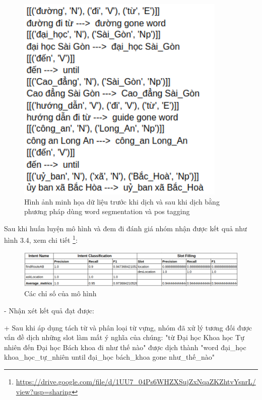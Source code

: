  \begin{figure}[htp]
              \centering
              \includegraphics[width=10cm]{images/trainingdata-wordsegment.png} 
              \caption{Hình ảnh minh họa dữ liệu trước khi dịch và sau khi dịch bằng phương pháp dùng word segmentation và pos tagging}
              \label{fig:sodohethongchiduong}

          \end{figure} 
	



Sau khi huấn luyện mô hình và đem đi đánh giá nhóm nhận được kết quả như  hình 3.4, xem chi tiết \footnote{\url{https://drive.google.com/file/d/1UU7_04Ps6WHZXSujZxNqaZKZhtvYsnrL/view?usp=sharing}}:
	
  \begin{figure}[htp]
              \centering
              \includegraphics[width=15cm]{images/metrics-dich-tung-t.png} 
              \caption{Các chỉ số của mô hình}
              \label{fig:sodohethongchiduong}

          \end{figure} 

- Nhận xét kết quả đạt được:

 + Sau khi áp dụng tách từ và phân loại từ vựng, nhóm đã xử lý tương đối được vấn đề dịch những slot làm mất ý nghĩa của chúng:
"từ Đại học Khoa học Tự nhiên đến Đại học Bách khoa đi như thế nào" được dịch thành "word đại\_học khoa\_học\_tự\_nhiên until đại\_học bách\_khoa gone như\_thế\_nào"

